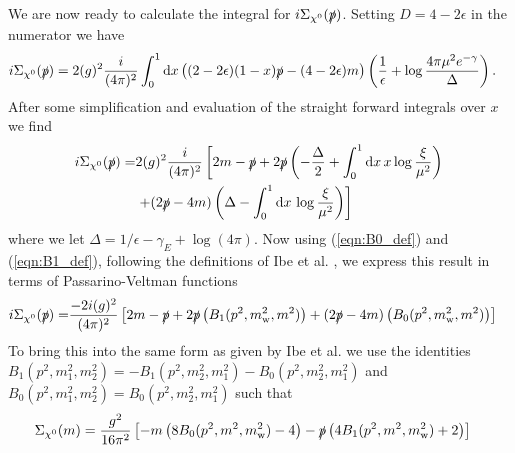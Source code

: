 \documentclass[11pt]{article}
\def\sp{\slashed{p}}
\def\cn{\chi^0}
\renewcommand{\d}{\ensuremath{\operatorname{d}\!}}
\begin{document}
We are now ready to calculate the integral for $i\Sigma_{\cn}(\slashed{p})$.  Setting $D=4-2\epsilon$ in the numerator we have
\begin{align}
i\Sigma_{\cn}(\slashed{p})&= 2 (g)^2 \frac{i}{(4\pi)^2}  \int_0^1 \d x \left( (2-2\epsilon)(1-x)\sp-(4-2\epsilon)m  \right) \left(\frac{1}{\epsilon}+\log\frac{4\pi\mu^2e^{-\gamma}}{\Delta}\right).
\end{align}
After some simplification and evaluation of the straight forward integrals over $x$ we find
\begin{align}
i\Sigma_{\cn}(\slashed{p})=& 2 (g)^2 \frac{i}{(4\pi)^2} \left[ 2m-\sp + 2\sp\left(-\frac{\Delta}{2}+\int_0^1\d x \, x \log\frac{\xi}{\mu^2}\right)\right. \\
&\left. + (2\sp-4m)\left(\Delta-\int_0^1\d x\, \log\frac{\xi}{\mu^2}\right)\right]
\end{align}
where we let $\Delta = 1/\epsilon-\gamma_E+\log(4\pi)$.  Now using (\ref{eqn:B0_def}) and (\ref{eqn:B1_def}), following the definitions of Ibe et al. \cite{Ibe2013a}, we express this result in terms of Passarino-Veltman functions
\begin{align}
i\Sigma_{\cn}(\slashed{p})=& \frac{-2i (g)^2}{(4\pi)^2} \left[ 2m-\sp + 2\sp\left(B_1(p^2,m_{\text{w}}^2,m^2)\right) + (2\sp-4m)\left(B_0(p^2,m_{\text{w}}^2,m^2)\right)\right]
\end{align}
To bring this into the same form as given by Ibe et al. \cite{Ibe2013a} we use the identities $B_1(p^2,m_1^2,m_2^2)=-B_1(p^2,m_2^2,m_1^2)-B_0(p^2,m_2^2,m_1^2)$ and $B_0(p^2,m_1^2,m_2^2)=B_0(p^2,m_2^2,m_1^2)$  such that
\begin{align}
\Sigma_{\cn}(m)&= \frac{g^2}{16\pi^2}   \left[ -m\left(8 B_0(p^2,m^2,m_{\text{w}}^2)-4\right)-\slashed{p}\left(4 B_1(p^2,m^2,m_{\text{w}}^2)+2\right)\right]
\end{align}

\vspace{0.5cm}
\end{document}
